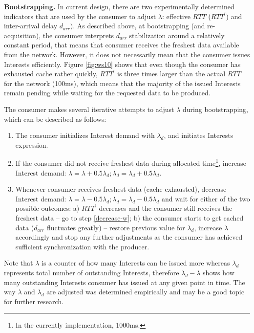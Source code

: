 \documentclass{icn/sig-alternate-2013} %
\newcommand{\wConcept}{Interest demand}
\begin{document}
\textbf{Bootstrapping.} In current design, there are two experimentally determined indicators that are used by the consumer to adjust $\lambda$: effective $RTT$ ($RTT^\prime$) and inter-arrival delay $d_{arr})$. As described above, at bootstrapping (and re-acquisition), the consumer interprets $d_{arr}$ stabilization around a relatively constant period, that means that consumer receives the freshest data available from the network. However, it does not necessarily mean that the consumer issues Interests efficiently. Figure \ref{fig:ws10} shows that even though the consumer has exhausted cache rather quickly, $RTT^\prime$ is three times larger than the actual $RTT$ for the network (100ms), which means that the majority of the issued Interests remain pending while waiting for the requested data to be produced.

The consumer makes several iterative attempts to adjust $\lambda$ during bootstrapping, which can be described as follows:
\begin{enumerate}
\item The consumer initializes \wConcept{} with $\lambda_d$, and initiates Interests expression.
\item If the consumer did not receive freshest data during allocated time\footnote{In the currently implementation, 1000ms.}, increase \wConcept{}: $\lambda=\lambda+0.5\lambda_d; \lambda_d = \lambda_d+0.5\lambda_d$.
\item \label{decrease-w} Whenever consumer receives freshest data (cache exhausted), decrease \wConcept{}: $\lambda=\lambda-0.5\lambda_d; \lambda_d = \lambda_d-0.5\lambda_d$ and wait for either of the two possible outcomes:
a) $RTT^\prime$ decreases and the consumer still receives the freshest data -- go to step \ref{decrease-w};
b) the consumer starts to get cached data ($d_{arr}$ fluctuates greatly) -- restore previous value for $\lambda_d$, increase $\lambda$ accordingly and stop any further adjustments as the consumer has achieved sufficient synchronization with the producer.
\end{enumerate}

Note that $\lambda$ is a counter of how many Interests can be issued more whereas $\lambda_d$ represents total number of outstanding Interests, therefore $\lambda_d-\lambda$ shows how many outstanding Interests consumer has issued at any given point in time. The way $\lambda$ and $\lambda_d$ are adjusted was determined empirically and may be a good topic for further research.
\end{document}
